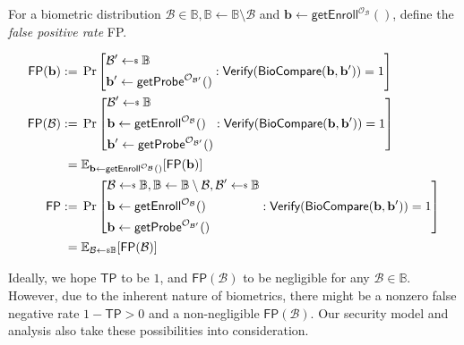 \begin{definition}
For a biometric distribution $\mathcal{B} \in \mathbb{B}, \mathbb{B} \gets \mathbb{B} \setminus \mathcal{B}$ and $\mathbf{b} \gets \textsf{getEnroll}^{\mathcal{O}_\mathcal{B}}()$, define the \emph{false positive rate} \textsf{FP}.

\begin{align*}
	\textsf{FP}(\mathbf{b}) 
	:=&\; \Pr \left[ 
		\begin{aligned}
			& \mathcal{B}^\prime \getsdollar \mathbb{B} \\
			& \mathbf{b}^\prime \gets \textsf{getProbe}^{\mathcal{O}_{\mathcal{B}^\prime}}()
		\end{aligned}
		: \textsf{Verify}(\textsf{BioCompare}(\mathbf{b}, \mathbf{b}^\prime)) = 1 \right] \\
	\textsf{FP}(\mathcal{B}) 
	:=&\; \Pr \left[ 
		\begin{aligned}
			& \mathcal{B}^\prime \getsdollar \mathbb{B} \\
			& \mathbf{b} \gets \textsf{getEnroll}^{\mathcal{O}_\mathcal{B} }() \\
			& \mathbf{b}^\prime \gets \textsf{getProbe}^{\mathcal{O}_{\mathcal{B}^\prime} }()
		\end{aligned}
		: \textsf{Verify}(\textsf{BioCompare}(\mathbf{b}, \mathbf{b}^\prime)) = 1 \right] \\
	=&\; \mathbb{E}_{ \mathbf{b} \gets \textsf{getEnroll}^{\mathcal{O}_\mathcal{B}}() }[\textsf{FP}(\mathbf{b})] \\
	\textsf{FP} 
	:=&\; \Pr \left[
		\begin{aligned}
			& \mathcal{B} \getsdollar \mathbb{B}, \mathbb{B} \gets \mathbb{B} \setminus \mathcal{B}, \mathcal{B}^\prime \getsdollar \mathbb{B} \\
			& \mathbf{b} \gets \textsf{getEnroll}^{\mathcal{O}_\mathcal{B} }() \\
			& \mathbf{b} \gets \textsf{getProbe}^{\mathcal{O}_{\mathcal{B}^\prime} }()
		\end{aligned}
		: \textsf{Verify}(\textsf{BioCompare}(\mathbf{b}, \mathbf{b}^\prime)) = 1 \right] \\
	=&\; \mathbb{E}_{\mathcal{B} \getsdollar \mathbb{B}}[\textsf{FP}(\mathcal{B})]
\end{align*}

\end{definition}

Ideally, we hope $\textsf{TP}$ to be $1$, and $\textsf{FP}(\mathcal{B})$ to be negligible for any $\mathcal{B} \in \mathbb{B}$. However, due to the inherent nature of biometrics, there might be a nonzero false negative rate $ 1 - \textsf{TP} > 0$ and a non-negligible $\textsf{FP}(\mathcal{B})$. Our security model and analysis also take these possibilities into consideration.


